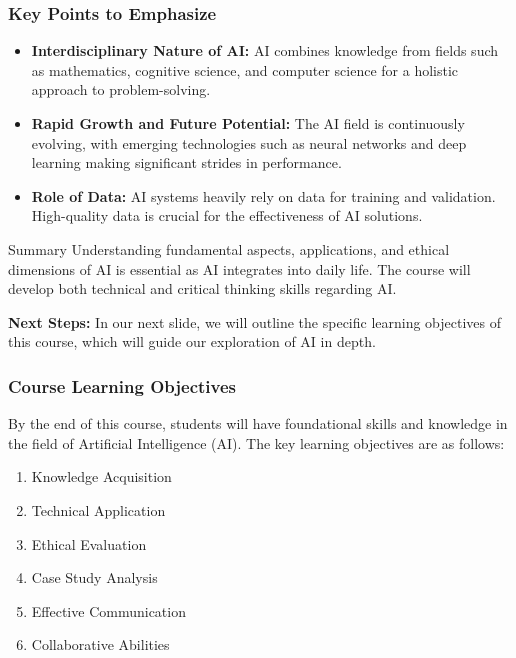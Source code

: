 \documentclass[aspectratio=169]{beamer}
\begin{document}
\begin{frame}[fragile]
    \frametitle{Key Points to Emphasize}
    \begin{itemize}
        \item \textbf{Interdisciplinary Nature of AI:} 
        AI combines knowledge from fields such as mathematics, cognitive science, and computer science for a holistic approach to problem-solving.
        
        \item \textbf{Rapid Growth and Future Potential:} 
        The AI field is continuously evolving, with emerging technologies such as neural networks and deep learning making significant strides in performance.
        
        \item \textbf{Role of Data:} 
        AI systems heavily rely on data for training and validation. High-quality data is crucial for the effectiveness of AI solutions.
    \end{itemize}

    \begin{block}{Summary}
        Understanding fundamental aspects, applications, and ethical dimensions of AI is essential as AI integrates into daily life. The course will develop both technical and critical thinking skills regarding AI.
    \end{block}
    
    \textbf{Next Steps:} In our next slide, we will outline the specific learning objectives of this course, which will guide our exploration of AI in depth.
\end{frame}

\begin{frame}[fragile]
    \frametitle{Course Learning Objectives}
    By the end of this course, students will have foundational skills and knowledge in the field of Artificial Intelligence (AI). The key learning objectives are as follows:
    \begin{enumerate}
        \item Knowledge Acquisition
        \item Technical Application
        \item Ethical Evaluation
        \item Case Study Analysis
        \item Effective Communication
        \item Collaborative Abilities
    \end{enumerate}
\end{frame}
\end{document}
